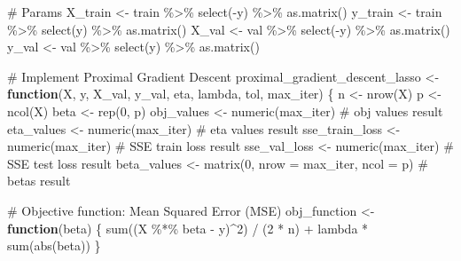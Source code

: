 \documentclass[
  letterpaper,
  DIV=11,
  numbers=noendperiod]{scrartcl}
\newenvironment{Shaded}{\begin{snugshade}}{\end{snugshade}}
\newcommand{\AttributeTok}[1]{\textcolor[rgb]{0.40,0.45,0.13}{#1}}
\newcommand{\CommentTok}[1]{\textcolor[rgb]{0.37,0.37,0.37}{#1}}
\newcommand{\ControlFlowTok}[1]{\textcolor[rgb]{0.00,0.23,0.31}{\textbf{#1}}}
\newcommand{\DecValTok}[1]{\textcolor[rgb]{0.68,0.00,0.00}{#1}}
\newcommand{\FunctionTok}[1]{\textcolor[rgb]{0.28,0.35,0.67}{#1}}
\newcommand{\NormalTok}[1]{\textcolor[rgb]{0.00,0.23,0.31}{#1}}
\newcommand{\OtherTok}[1]{\textcolor[rgb]{0.00,0.23,0.31}{#1}}
\newcommand{\SpecialCharTok}[1]{\textcolor[rgb]{0.37,0.37,0.37}{#1}}
\begin{document}
\begin{Shaded}
\begin{Highlighting}[]
\CommentTok{\# Params}
\NormalTok{X\_train }\OtherTok{\textless{}{-}}\NormalTok{ train }\SpecialCharTok{\%\textgreater{}\%}
  \FunctionTok{select}\NormalTok{(}\SpecialCharTok{{-}}\NormalTok{y) }\SpecialCharTok{\%\textgreater{}\%}
  \FunctionTok{as.matrix}\NormalTok{()}
\NormalTok{y\_train }\OtherTok{\textless{}{-}}\NormalTok{ train }\SpecialCharTok{\%\textgreater{}\%}
  \FunctionTok{select}\NormalTok{(y) }\SpecialCharTok{\%\textgreater{}\%}
  \FunctionTok{as.matrix}\NormalTok{()}
\NormalTok{X\_val }\OtherTok{\textless{}{-}}\NormalTok{ val }\SpecialCharTok{\%\textgreater{}\%}
  \FunctionTok{select}\NormalTok{(}\SpecialCharTok{{-}}\NormalTok{y) }\SpecialCharTok{\%\textgreater{}\%}
  \FunctionTok{as.matrix}\NormalTok{()}
\NormalTok{y\_val }\OtherTok{\textless{}{-}}\NormalTok{ val }\SpecialCharTok{\%\textgreater{}\%}
  \FunctionTok{select}\NormalTok{(y) }\SpecialCharTok{\%\textgreater{}\%}
  \FunctionTok{as.matrix}\NormalTok{()}


\CommentTok{\# Implement Proximal Gradient Descent}
\NormalTok{proximal\_gradient\_descent\_lasso }\OtherTok{\textless{}{-}} \ControlFlowTok{function}\NormalTok{(X, y, X\_val, y\_val, eta, lambda, tol, max\_iter) \{}
\NormalTok{  n }\OtherTok{\textless{}{-}} \FunctionTok{nrow}\NormalTok{(X)}
\NormalTok{  p }\OtherTok{\textless{}{-}} \FunctionTok{ncol}\NormalTok{(X)}
\NormalTok{  beta }\OtherTok{\textless{}{-}} \FunctionTok{rep}\NormalTok{(}\DecValTok{0}\NormalTok{, p)}
\NormalTok{  obj\_values }\OtherTok{\textless{}{-}} \FunctionTok{numeric}\NormalTok{(max\_iter) }\CommentTok{\# obj values result}
\NormalTok{  eta\_values }\OtherTok{\textless{}{-}} \FunctionTok{numeric}\NormalTok{(max\_iter)  }\CommentTok{\# eta values result}
\NormalTok{  sse\_train\_loss }\OtherTok{\textless{}{-}} \FunctionTok{numeric}\NormalTok{(max\_iter)  }\CommentTok{\# SSE train loss result}
\NormalTok{  sse\_val\_loss }\OtherTok{\textless{}{-}} \FunctionTok{numeric}\NormalTok{(max\_iter)  }\CommentTok{\# SSE test loss result}
\NormalTok{  beta\_values }\OtherTok{\textless{}{-}} \FunctionTok{matrix}\NormalTok{(}\DecValTok{0}\NormalTok{, }\AttributeTok{nrow =}\NormalTok{ max\_iter, }\AttributeTok{ncol =}\NormalTok{ p) }\CommentTok{\# betas result}
  
  
  \CommentTok{\# Objective function: Mean Squared Error (MSE)}
\NormalTok{  obj\_function }\OtherTok{\textless{}{-}} \ControlFlowTok{function}\NormalTok{(beta) \{}
    \FunctionTok{sum}\NormalTok{((X }\SpecialCharTok{\%*\%}\NormalTok{ beta }\SpecialCharTok{{-}}\NormalTok{ y)}\SpecialCharTok{\^{}}\DecValTok{2}\NormalTok{) }\SpecialCharTok{/}\NormalTok{ (}\DecValTok{2} \SpecialCharTok{*}\NormalTok{ n) }\SpecialCharTok{+}\NormalTok{ lambda }\SpecialCharTok{*} \FunctionTok{sum}\NormalTok{(}\FunctionTok{abs}\NormalTok{(beta))}
\NormalTok{  \}}
  

\end{Highlighting}
\end{Shaded}
\end{document}
